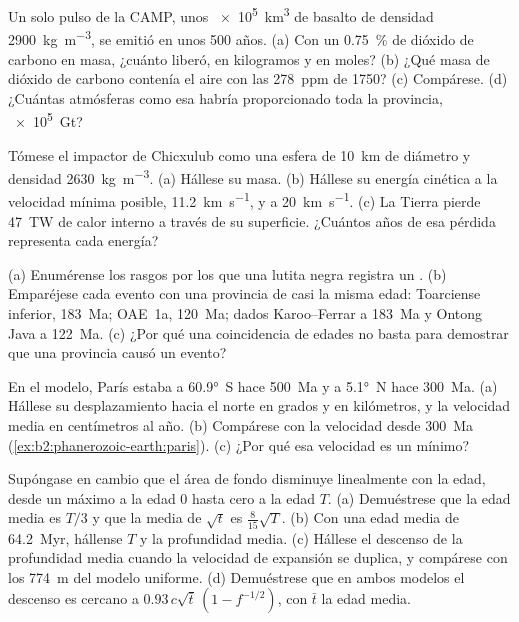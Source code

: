 \begin{exercise}[$\star\star$]\label{exo:b2:phanerozoic-earth:6}
Un solo pulso de la CAMP, unos \qty{e5}{km^3} de basalto de densidad \qty{2900}{kg.m^{-3}},
se emitió en unos 500 años. (a) Con un \qty{0.75}{\percent} de dióxido de carbono en masa, ¿cuánto
liberó, en kilogramos y en moles? (b) ¿Qué masa de dióxido de carbono contenía el aire con
las \qty{278}{ppm} de 1750? (c) Compárese. (d) ¿Cuántas atmósferas como esa habría proporcionado toda la provincia,
\qty{e5}{Gt}?
\end{exercise}

\begin{exercise}[$\star\star$]\label{exo:b2:phanerozoic-earth:7}
Tómese el impactor de Chicxulub como una esfera de \qty{10}{km} de diámetro y densidad
\qty{2630}{kg.m^{-3}}. (a) Hállese su masa. (b) Hállese su energía cinética a la velocidad mínima posible,
\qty{11.2}{km.s^{-1}}, y a \qty{20}{km.s^{-1}}. (c) La Tierra pierde \qty{47}{TW} de
calor interno a través de su superficie. ¿Cuántos años de esa pérdida representa cada energía?
\end{exercise}

\begin{exercise}[$\star\star$]\label{exo:b2:phanerozoic-earth:8}
(a) Enumérense los rasgos por los que una lutita negra registra un . (b) Emparéjese cada
evento con una provincia de casi la misma edad: Toarciense inferior, \qty{183}{Ma}; OAE~1a,
\qty{120}{Ma}; dados Karoo--Ferrar a \qty{183}{Ma} y Ontong Java a \qty{122}{Ma}. (c) ¿Por qué una
coincidencia de edades no basta para demostrar que una provincia causó un evento?
\end{exercise}

\begin{exercise}[$\star\star$]\label{exo:b2:phanerozoic-earth:9}
En el modelo, París estaba a \ang{60.9}~S hace \qty{500}{Ma} y a \ang{5.1}~N hace \qty{300}{Ma}.
(a) Hállese su desplazamiento hacia el norte en grados y en kilómetros, y la velocidad media en
centímetros al año. (b) Compárese con la velocidad desde \qty{300}{Ma}
(\cref{ex:b2:phanerozoic-earth:paris}). (c) ¿Por qué esa velocidad es un mínimo?
\end{exercise}

\begin{exercise}[$\star\star\star$]\label{exo:b2:phanerozoic-earth:10}
Supóngase en cambio que el área de fondo disminuye linealmente con la edad, desde un máximo a la edad 0 hasta cero
a la edad $T$. (a) Demuéstrese que la edad media es $T/3$ y que la media de $\sqrt t$ es
$\tfrac{8}{15}\sqrt T$. (b) Con una edad media de \qty{64.2}{Myr}, hállense $T$ y la profundidad media. (c)
Hállese el descenso de la profundidad media cuando la velocidad de expansión se duplica, y compárese con los
\qty{774}{m} del modelo uniforme. (d) Demuéstrese que en ambos modelos el descenso es cercano a $0.93\,c\sqrt{\bar
t}\,(1 - f^{-1/2})$, con $\bar t$ la edad media.
\end{exercise}

